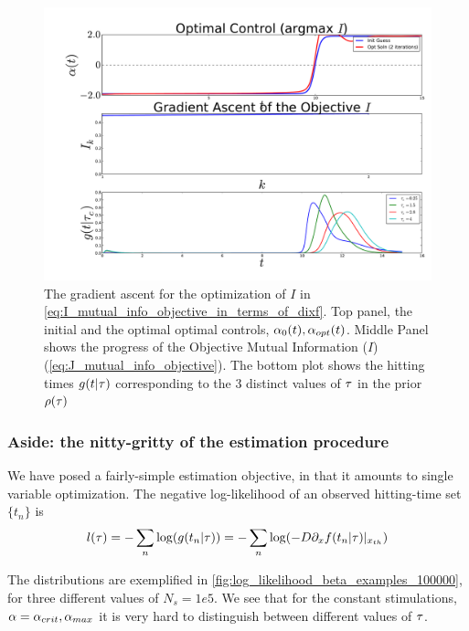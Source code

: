 \documentclass{article}
\begin{document}
\begin{figure}[htp]
\begin{center}
  \includegraphics[width=1\textwidth]{Figs/FP_Adjoint/OptControl_MI_HT_4.pdf}
  \caption[labelInTOC]{The gradient ascent for the optimization of $I$ in
  \cref{eq:I_mutual_info_objective_in_terms_of_dixf}. Top panel, the initial and
  the optimal optimal controls, ${\alpha}_{0}(t), {\alpha}_{opt}(t)$. Middle Panel
  shows the progress of the Objective Mutual Information ($I$) 
  (\cref{eq:J_mutual_info_objective}). 
  The bottom plot shows the hitting times $g(t| { \tau })$ corresponding to the 3
  distinct values of ${ \tau }$ in the prior $\rho({ \tau })$}  
  \label{fig:hitting_time_density_g_aopt_bprior}  
\end{center}   
\end{figure}  

\subsubsection{Aside: the nitty-gritty of the estimation procedure}
We have posed a fairly-simple estimation objective, in that it amounts to single
variable optimization. The negative log-likelihood of an observed hitting-time
set $\{t_n\}$ is
\begin{equation}
l({ \tau }) = - \sum_n \log ( g(t_n | { \tau }) ) =  - \sum_n \log ( -D {\partial}_x f(t_n |
{ \tau }) |_{{ x_{th} }} )
\end{equation}

The distributions are exemplified in
\cref{fig:log_likelihood_beta_examples_100000},
for three different values of $N_s =  1e5$. We see that for the constant
stimulations, ${\alpha} = {\alpha}_{crit}, {\alpha}_{max}$ it is very hard to
distinguish between different values of ${ \tau }$. 
\end{document}
